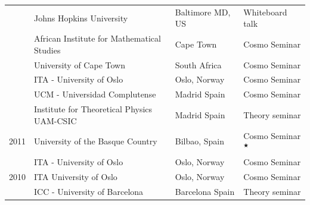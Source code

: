 \documentclass[11pt,a4paper]{article}
\begin{document}
\begin{longtable}{l p{} p{3.5cm} p{3cm}}
& {Johns Hopkins University} & Baltimore MD, US & Whiteboard talk \\ 
  & {African Institute for Mathematical Studies} & Cape Town & Cosmo Seminar \\
  & {University of Cape Town} & South Africa & Cosmo Seminar \\  
  & {ITA - University of Oslo} & Oslo, Norway & Cosmo Seminar \\
  & {UCM - Universidad Complutense} & Madrid Spain & Cosmo Seminar \\ 
  & {Institute for Theoretical Physics UAM-CSIC} & Madrid Spain & Theory seminar
  \\[2pt] 2011 
  & {University of the Basque Country} & Bilbao, Spain & Cosmo Seminar$^\bigstar$ \\
  & {ITA - University of Oslo} & Oslo, Norway & Cosmo Seminar 
  \\[2pt] 2010  & {ITA University of Oslo} & Oslo, Norway & Cosmo Seminar \\
 & {ICC - University of Barcelona} & Barcelona Spain & Theory seminar \\
\end{longtable}
\end{document}
